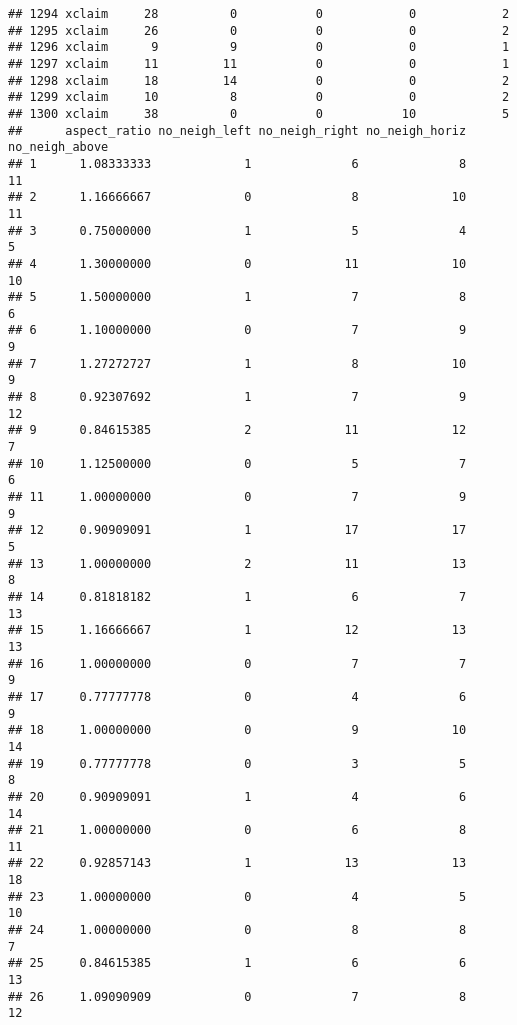 \documentclass[
]{article}
\begin{document}
\begin{verbatim}
## 1294 xclaim     28          0           0            0            2
## 1295 xclaim     26          0           0            0            2
## 1296 xclaim      9          9           0            0            1
## 1297 xclaim     11         11           0            0            1
## 1298 xclaim     18         14           0            0            2
## 1299 xclaim     10          8           0            0            2
## 1300 xclaim     38          0           0           10            5
##      aspect_ratio no_neigh_left no_neigh_right no_neigh_horiz no_neigh_above
## 1      1.08333333             1              6              8             11
## 2      1.16666667             0              8             10             11
## 3      0.75000000             1              5              4              5
## 4      1.30000000             0             11             10             10
## 5      1.50000000             1              7              8              6
## 6      1.10000000             0              7              9              9
## 7      1.27272727             1              8             10              9
## 8      0.92307692             1              7              9             12
## 9      0.84615385             2             11             12              7
## 10     1.12500000             0              5              7              6
## 11     1.00000000             0              7              9              9
## 12     0.90909091             1             17             17              5
## 13     1.00000000             2             11             13              8
## 14     0.81818182             1              6              7             13
## 15     1.16666667             1             12             13             13
## 16     1.00000000             0              7              7              9
## 17     0.77777778             0              4              6              9
## 18     1.00000000             0              9             10             14
## 19     0.77777778             0              3              5              8
## 20     0.90909091             1              4              6             14
## 21     1.00000000             0              6              8             11
## 22     0.92857143             1             13             13             18
## 23     1.00000000             0              4              5             10
## 24     1.00000000             0              8              8              7
## 25     0.84615385             1              6              6             13
## 26     1.09090909             0              7              8             12

\end{verbatim}
\end{document}
